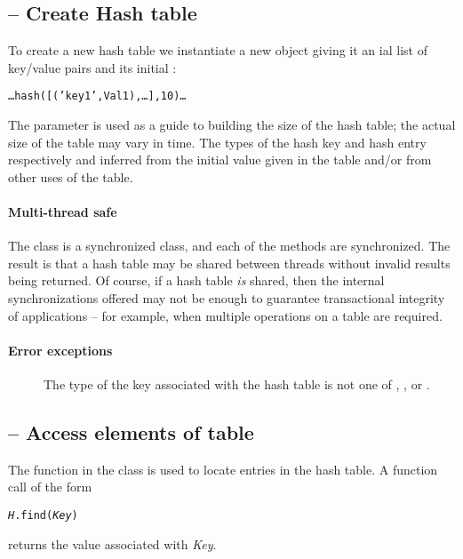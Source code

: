\subsection{ -- Create Hash table}
\label{hash:newhash}


To create a new hash table we instantiate a new  object giving it an ial list of key/value pairs and its initial :

\begin{alltt}
\ldots hash([('key1',Val1),\ldots],10) \ldots
\end{alltt}
The  parameter is used as a guide to building the size of the hash table; the actual size of the table may vary in time. The types of the hash key and hash entry respectively and inferred from the initial value given in the  table and/or from other uses of the table.

\paragraph{Multi-thread safe}
The  class is a synchronized class, and each of the methods are synchronized. The result is that a hash table may be shared between threads without invalid results being returned. Of course, if a hash table \emph{is} shared, then the internal synchronizations offered may not be enough to guarantee transactional integrity of applications -- for example, when multiple operations on a  table are required.

\paragraph{Error exceptions}
\begin{description}
\item[]
The type of the key associated with the hash table is not one of , ,  or .
\end{description}

\subsection{ -- Access elements of table}
\label{hash:find}

The  function in the  class is used to locate entries in the hash table. A function call of the form
\begin{alltt}
\emph{H}.find(\emph{Key})
\end{alltt}
returns the value associated with \emph{Key}.

